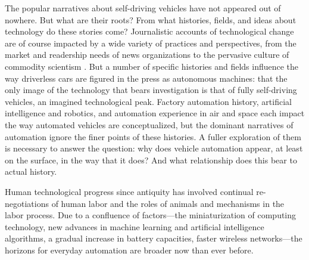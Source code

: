 

The popular narratives about self-driving vehicles have not appeared
out of nowhere. But what are their roots? From what histories, fields,
and ideas about technology do these stories come? Journalistic
accounts of technological change are of 
course impacted by a wide variety of practices and perspectives, from
the market and readership needs of news organizations to the pervasive
culture of commodity scientism \cite{smithSelling}. But a number of
specific histories and
fields influence the way driverless cars are figured in the press as
autonomous machines: that the only image of the technology that bears
investigation is that of fully self-driving vehicles, an imagined
technological peak. Factory automation history,
artificial intelligence and robotics, and automation experience in
air and space each impact the way automated vehicles are
conceptualized, but the dominant narratives of automation ignore the finer
points of these histories. A fuller exploration of them is necessary to
answer the question:  why does vehicle
automation appear, at least on the surface, in the way that it does?
And what relationship does this bear to actual history.




Human technological progress since antiquity has
involved continual re-negotiations of human labor and the roles of
animals and mechanisms in the labor process. Due to a confluence
of factors---the miniaturization of computing technology, new
advances in machine learning and artificial intelligence algorithms, a
gradual increase in battery capacities, faster wireless networks---the
horizons for everyday automation are broader now than ever before. 

